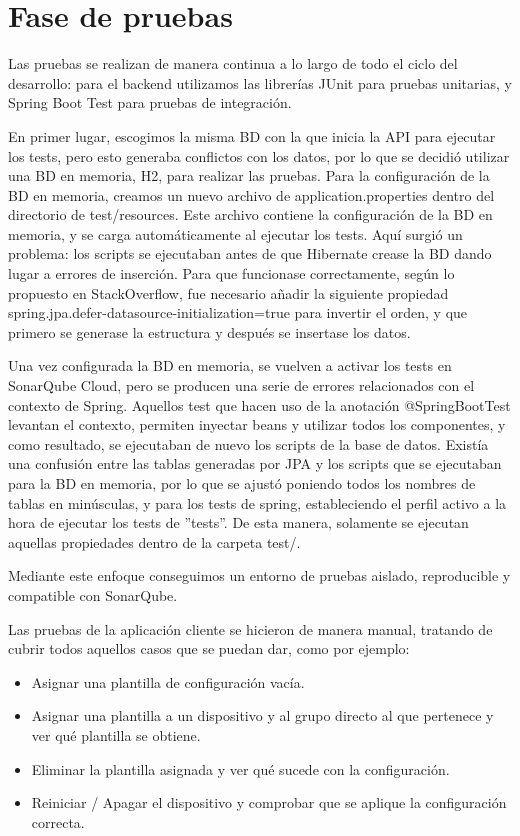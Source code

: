 \section{Fase de pruebas}\label{sec:fase-de-pruebas}

Las pruebas se realizan de manera continua a lo largo de todo el ciclo del desarrollo: para el backend utilizamos las
librerías JUnit para pruebas unitarias, y Spring Boot Test para pruebas de integración.

En primer lugar, escogimos la misma BD con la que inicia la API para ejecutar los tests, pero esto generaba
conflictos con los datos, por lo que se decidió utilizar una BD en memoria, H2, para realizar las pruebas.
Para la configuración de la BD en memoria, creamos un nuevo archivo de application.properties dentro del directorio
de test/resources.
Este archivo contiene la configuración de la BD en memoria, y se carga automáticamente al ejecutar los tests.
Aquí surgió un problema: los scripts se ejecutaban antes de que Hibernate crease la BD dando lugar a errores de inserción.
Para que funcionase correctamente, según lo propuesto en StackOverflow\cite{stackoverflowSpringBootError},
fue necesario añadir la siguiente propiedad spring.jpa.defer-datasource-initialization=true para invertir el orden, y
que primero se generase la estructura y después se insertase los datos.

Una vez configurada la BD en memoria, se vuelven a activar los tests en SonarQube Cloud, pero se producen una serie
de errores relacionados con el contexto de Spring.
Aquellos test que hacen uso de la anotación @SpringBootTest levantan el contexto, permiten inyectar beans y utilizar
todos los componentes, y como resultado, se ejecutaban de nuevo los scripts de la base de datos.
Existía una confusión entre las tablas generadas por JPA y los scripts que se ejecutaban para la BD en memoria,
por lo que se ajustó poniendo todos los nombres de tablas en minúsculas, y para los tests de spring,
estableciendo el perfil activo a la hora de ejecutar los tests de ''tests''.
De esta manera, solamente se ejecutan aquellas propiedades dentro de la carpeta test/.

Mediante este enfoque conseguimos un entorno de pruebas aislado, reproducible y compatible con SonarQube.

Las pruebas de la aplicación cliente se hicieron de manera manual, tratando de cubrir todos aquellos casos que
se puedan dar, como por ejemplo:
\begin{itemize}
    \item Asignar una plantilla de configuración vacía.
    \item Asignar una plantilla a un dispositivo y al grupo directo al que pertenece y ver qué plantilla se obtiene.
    \item Eliminar la plantilla asignada y ver qué sucede con la configuración.
    \item Reiniciar / Apagar el dispositivo y comprobar que se aplique la configuración correcta.
\end{itemize}

